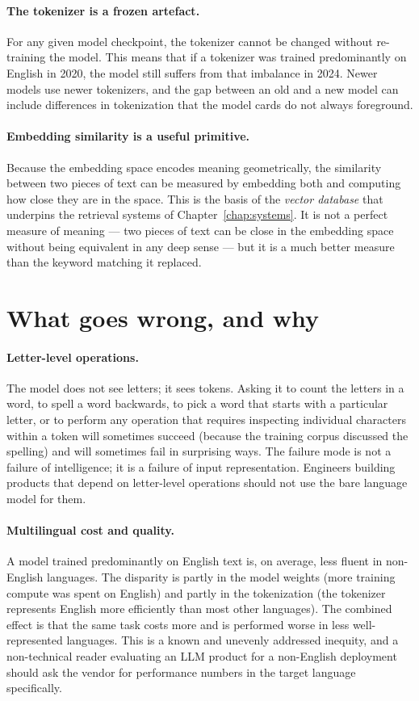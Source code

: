 \paragraph{The tokenizer is a frozen artefact.} For any given
model checkpoint, the tokenizer cannot be changed without
re-training the model. This means that if a tokenizer was
trained predominantly on English in 2020, the model still
suffers from that imbalance in 2024. Newer models use newer
tokenizers, and the gap between an old and a new model can
include differences in tokenization that the model cards do not
always foreground.

\paragraph{Embedding similarity is a useful primitive.} Because
the embedding space encodes meaning geometrically, the
similarity between two pieces of text can be measured by
embedding both and computing how close they are in the space.
This is the basis of the \emph{vector database} that
underpins the retrieval systems of Chapter~\ref{chap:systems}. It is not a
perfect measure of meaning --- two pieces of text can be close
in the embedding space without being equivalent in any deep
sense --- but it is a much better measure than the keyword
matching it replaced.

\section{What goes wrong, and why}

\paragraph{Letter-level operations.} The model does not see
letters; it sees tokens. Asking it to count the letters in a
word, to spell a word backwards, to pick a word that starts
with a particular letter, or to perform any operation that
requires inspecting individual characters within a token will
sometimes succeed (because the training corpus discussed the
spelling) and will sometimes fail in surprising ways. The
failure mode is not a failure of intelligence; it is a failure
of input representation. Engineers building products that
depend on letter-level operations should not use the bare
language model for them.

\paragraph{Multilingual cost and quality.} A model trained
predominantly on English text is, on average, less fluent in
non-English languages. The disparity is partly in the model
weights (more training compute was spent on English) and partly
in the tokenization (the tokenizer represents English more
efficiently than most other languages). The combined effect is
that the same task costs more and is performed worse in less
well-represented languages. This is a known and unevenly
addressed inequity, and a non-technical reader evaluating an
LLM product for a non-English deployment should ask the vendor
for performance numbers in the target language specifically.

